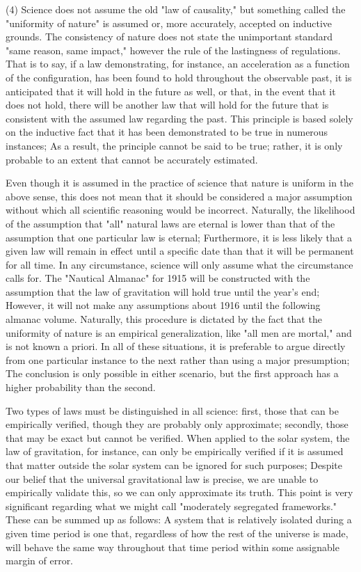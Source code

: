 \documentclass[a4paper,12pt]{book}[2004/02/16]
\theoremstyle{ilemma}
\theoremstyle{itheorem}
\theoremstyle{iother}
\theoremstyle{icorollary}
\theoremstyle{numcorollary}
\theoremstyle{idefinition}
\begin{document}
(4) Science does not assume the old "law of causality," but something called the "uniformity of nature" is assumed or, more accurately, accepted on inductive grounds. The consistency of nature does
not state the unimportant standard "same reason, same impact," however the
rule of the lastingness of regulations. That is to say, if a law demonstrating, for instance, an acceleration as a function of the configuration, has been found to hold throughout the observable past, it is anticipated that it will hold in the future as well, or that, in the event that it does not hold, there will be another law that will hold for the future that is consistent with the assumed law regarding the past. This principle is based solely on the inductive fact that it has been demonstrated to be true in numerous instances; As a result, the principle cannot be said to be true; rather, it is only probable to an extent that cannot be accurately estimated.

Even though it is assumed in the practice of science that nature is uniform in the above sense, this does not mean that it should be considered a major assumption without which all scientific reasoning would be incorrect. Naturally, the likelihood of the assumption that "all" natural laws are eternal is lower than that of the assumption that one particular law is eternal; Furthermore, it is less likely that a given law will remain in effect until a specific date than that it will be permanent for all time. In any circumstance, science will only assume what the circumstance calls for. The "Nautical Almanac" for 1915 will be constructed with the assumption that the law of gravitation will hold true until the year's end; However, it will not make any assumptions about 1916 until the following almanac volume. Naturally, this procedure is dictated by the fact that the uniformity of nature is an empirical generalization, like "all men are mortal," and is not known a priori. In all of these situations, it is preferable to argue directly from one particular instance to the next rather than using a major presumption; The conclusion is only possible in either scenario, but the first approach has a higher probability than the second.

Two types of laws must be distinguished in all science: first, those that can be empirically verified, though they are probably only approximate;
secondly, those that may be exact but cannot be verified. When applied to the solar system, the law of gravitation, for instance, can only be empirically verified if it is assumed that matter outside the solar system can be ignored for such purposes; Despite our belief that the universal gravitational law is precise, we are unable to empirically validate this, so we can only approximate its truth. This point is very
significant regarding what we might call "moderately segregated
frameworks." These can be summed up as follows: A system that is relatively isolated during a given time period is one that, regardless of how the rest of the universe is made, will behave the same way throughout that time period within some assignable margin of error.
\end{document}
